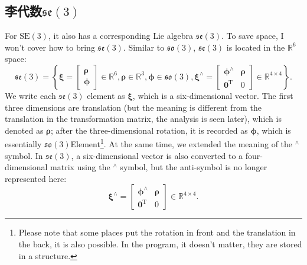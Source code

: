    \subsection{李代数$\mathfrak{se}(3)$}
            For $\mathrm{SE}(3)$, it also has a corresponding Lie algebra $\mathfrak{se}(3)$. To save space, I won't cover how to bring $\mathfrak{se}(3)$. Similar to $\mathfrak{so}(3)$, $\mathfrak{se}(3)$ is located in the $\mathbb{R}^6$ space:
            \begin{equation}
            \mathfrak{se}(3) = \left\{ { \boldsymbol{\xi} = \left[ \begin{array}{l}
              \boldsymbol{\rho} \\
                \boldsymbol{\phi}
              \end{array} \right]
                \in { \mathbb{R}^6} ,
                \boldsymbol{\rho} \in { \mathbb{R}^3}, \boldsymbol{\phi} \in \mathfrak{so} \left( 3 \right),{ \boldsymbol{\xi} ^ \wedge } = \left[ {\begin{array}{*{20}{c}}
                  {{ \boldsymbol{\phi} ^ \wedge }}& \boldsymbol{\rho} \\
                  {{\bm{0}^\mathrm{T}}}&0
                  \end{array}} \right] \in { \mathbb{R}^{4 \times 4}}} \right\}.
                  \end{equation}
                  We write each $\mathfrak{se}(3)$ element as $\boldsymbol{\xi}$, which is a six-dimensional vector. The first three dimensions are translation (but the meaning is different from the translation in the transformation matrix, the analysis is seen later), which is denoted as $\boldsymbol{\rho}$; after the three-dimensional rotation, it is recorded as $\boldsymbol{\phi}$, which is essentially $\mathfrak{so}(3)$Element\footnote{Please note that some places put the rotation in front and the translation in the back, it is also possible. In the program, it doesn't matter, they are stored in a structure. }. At the same time, we extended the meaning of the $^\wedge$ symbol. In $\mathfrak{se}(3)$, a six-dimensional vector is also converted to a four-dimensional matrix using the $^\wedge$ symbol, but the anti-symbol is no longer represented here:
                  \begin{equation}
{ \boldsymbol{\xi} ^ \wedge } = \left[ {\begin{array}{*{20}{c}}
  {{ \boldsymbol{\phi} ^ \wedge }}& \boldsymbol{\rho} \\
  {{\bm{0}^\mathrm{T}}}&0
  \end{array}} \right] \in { \mathbb{R}^{4 \times 4}}.
  \end{equation}

